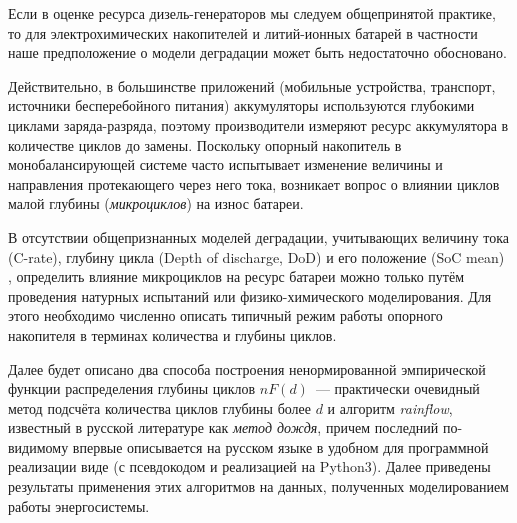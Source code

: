 Если в оценке ресурса дизель-генераторов мы следуем общепринятой практике, то для электрохимических накопителей и литий-ионных батарей в частности наше предположение о модели деградации может быть недостаточно обосновано.

Действительно, в большинстве приложений (мобильные устройства, транспорт, источники бесперебойного питания) аккумуляторы используются глубокими циклами заряда-разряда, поэтому производители измеряют ресурс аккумулятора в количестве циклов до замены. 
Поскольку опорный накопитель в монобалансирующей системе часто испытывает изменение величины и направления протекающего через него тока, возникает вопрос о влиянии циклов малой глубины (\textit{микроциклов}) на износ батареи.

В отсутствии общепризнанных моделей деградации, учитывающих величину тока (C-rate), глубину цикла (Depth of discharge, DoD) и его положение (SoC mean) \cite{laresgoiti2015modeling}, определить влияние микроциклов на ресурс батареи можно только путём проведения натурных испытаний или физико-химического моделирования. 
Для этого необходимо численно описать типичный режим работы опорного накопителя в терминах количества и глубины циклов.

Далее будет описано два способа построения ненормированной эмпирической функции распределения глубины циклов $nF(d)$~--- практически очевидный метод подсчёта количества циклов глубины более $d$ и алгоритм \textit{rainflow}, известный в русской литературе как \textit{метод дождя}, причем последний по-видимому впервые описывается на русском языке в удобном для программной реализации виде (с псевдокодом и реализацией на Python3).
Далее приведены результаты применения этих алгоритмов на данных, полученных моделированием работы энергосистемы.

